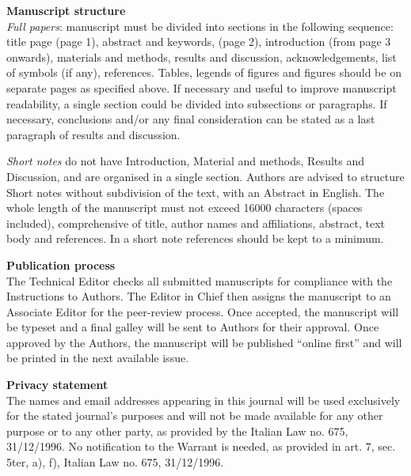 {  \noindent\textbf{Manuscript structure}\\
\textsl{Full papers}: manuscript must be divided into sections in the following sequence: title page (page 1), abstract and keywords, (page 2), introduction (from page 3 onwards), materials and methods, results and discussion, acknowledgements, list of symbols (if any), references. Tables, legends of
figures and figures should be on separate pages as specified above. If necessary and useful to improve manuscript readability, a single section could be divided into subsections or paragraphs.
If necessary, conclusions and/or any final consideration can be stated as a last paragraph of
results and discussion.
 
\noindent\textsl{Short notes} %
do not have Introduction, Material
and methods, Results and Discussion, and are organised in a single section. Authors are advised to structure Short notes without subdivision of the text, with an Abstract in English.
The whole length of the manuscript must not exceed 16000 characters (spaces included), comprehensive of title, author names and affiliations, abstract, text body and references. In a short note references should be kept to a minimum.

  \noindent\textbf{Publication process}\\  
The Technical Editor checks all submitted manuscripts for compliance with the Instructions to
Authors. The Editor in Chief then assigns the manuscript to an Associate Editor for the peer-review process. %
Once accepted, the manuscript will be typeset and a final galley will be sent to Authors for their approval. Once approved by the Authors, the manuscript will be published ``online first'' and will be printed in the next available issue.

\vfill 
\begin{footnotesize} %
\noindent\textbf{Privacy statement}\\
The names and email addresses appearing in this journal will be used
exclusively for the stated journal's purposes and will not be made available for any other
purpose or to any other party, as provided by the Italian Law no. 675, 31/12/1996. No notification to the Warrant is needed, as provided in art. 7, sec. 5ter, a), f), Italian Law no. 675,
31/12/1996.


\end{footnotesize}}
